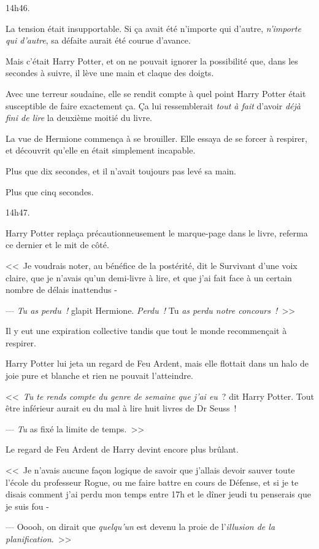 14h46.

La tension était insupportable. Si ça avait été n'importe qui d'autre, \emph{n'importe qui d'autre}, sa défaite aurait été courue d'avance.

Mais c'était Harry Potter, et on ne pouvait ignorer la possibilité que, dans les secondes à suivre, il lève une main et claque des doigts.

Avec une terreur soudaine, elle se rendit compte à quel point Harry Potter était susceptible de faire exactement ça. Ça lui ressemblerait \emph{tout à fait} d'avoir \emph{déjà fini de lire} la deuxième moitié du livre.

La vue de Hermione commença à se brouiller. Elle essaya de se forcer à respirer, et découvrit qu'elle en était simplement incapable.

Plus que dix secondes, et il n'avait toujours pas levé sa main.

Plus que cinq secondes.

14h47.

Harry Potter replaça précautionneusement le marque-page dans le livre, referma ce dernier et le mit de côté.

<<~Je voudrais noter, au bénéfice de la postérité, dit le Survivant d'une voix claire, que je n'avais qu'un demi-livre à lire, et que j'ai fait face à un certain nombre de délais inattendus -

--- \emph{Tu as perdu~!} glapit Hermione. \emph{Perdu~!} Tu \emph{as perdu notre concours~!}~>>

Il y eut une expiration collective tandis que tout le monde recommençait à respirer.

Harry Potter lui jeta un regard de Feu Ardent, mais elle flottait dans un halo de joie pure et blanche et rien ne pouvait l'atteindre.

<<~\emph{Tu te rends compte du genre de semaine que j'ai eu}~? dit Harry Potter. Tout être inférieur aurait eu du mal à lire huit livres de Dr Seuss~!

--- \emph{Tu} as fixé la limite de temps.~>>

Le regard de Feu Ardent de Harry devint encore plus brûlant.

<<~Je n'avais aucune façon logique de savoir que j'allais devoir sauver toute l'école du professeur Rogue, ou me faire battre en cours de Défense, et si je te disais comment j'ai perdu mon temps entre 17h et le dîner jeudi tu penserais que je suis fou -

--- Ooooh, on dirait que \emph{quelqu'un} est devenu la proie de l'\emph{illusion de la planification}.~>>

